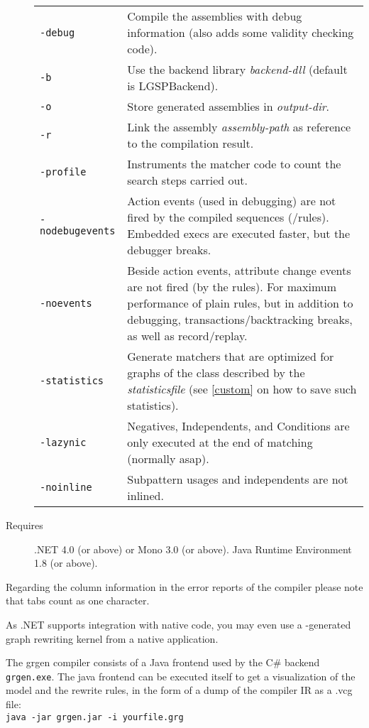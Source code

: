 \begin{description}
\begin{tabularx}{\linewidth}{lX}
      \texttt{-debug} & Compile the assemblies with debug information (also adds some validity checking code).\\
      \texttt{-b} & Use the backend library \emph{backend-dll} (default is LGSPBackend).\\
      \texttt{-o} & Store generated assemblies in \emph{output-dir}.\\
      \texttt{-r} & Link the assembly \emph{assembly-path} as reference to the compilation result.\\
      \texttt{-profile} & Instruments the matcher code to count the search steps carried out.\\
      \texttt{-nodebugevents} & Action events (used in debugging) are not fired by the compiled sequences (/rules). Embedded execs are executed faster, but the debugger breaks.\\
      \texttt{-noevents} & Beside action events, attribute change events are not fired (by the rules). For maximum performance of plain rules, but in addition to debugging, transactions/backtracking breaks, as well as record/replay.\\
      \texttt{-statistics} & Generate matchers that are optimized for graphs of the class described by the \emph{statisticsfile} (see \ref{custom} on how to save such statistics).\\
      \texttt{-lazynic} & Negatives, Independents, and Conditions are only executed at the end of matching (normally asap).\\
      \texttt{-noinline} & Subpattern usages and independents are not inlined.\\
    \end{tabularx}
  \item[Requires] .NET 4.0 (or above) or Mono 3.0 (or above). Java Runtime Environment 1.8 (or above).
\end{description}

\begin{note}
Regarding the column information in the error reports of the compiler please note that tabs count as one character.
\end{note}

\begin{note}
As .NET supports integration with native code, you may even use a \GrG-generated graph rewriting kernel from a native application.
\end{note}

\begin{note}\label{note:modelruledump}
The grgen compiler consists of a Java frontend used by the C\# backend \texttt{grgen.exe}.
The java frontend can be executed itself to get a visualization of the model and the rewrite rules,
in the form of a dump of the compiler IR as a .vcg file:\\
\texttt{java -jar grgen.jar -i yourfile.grg}
\end{note}

